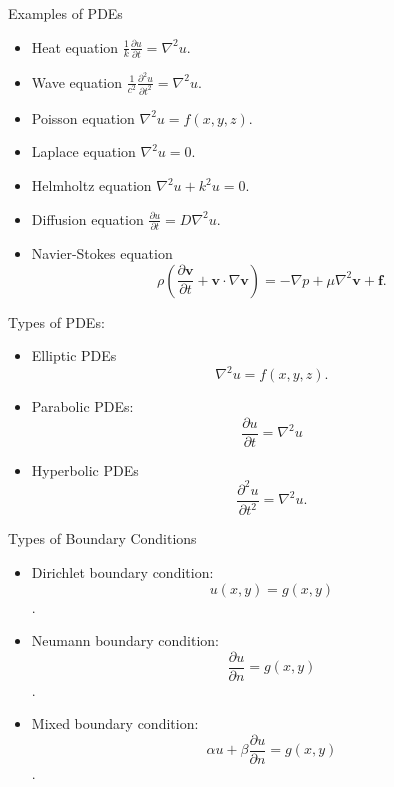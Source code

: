 \documentclass{beamer}
\begin{document}
\begin{frame}{Examples of PDEs}
    \begin{itemize}
            \item Heat equation $\frac{1}{k} \frac{\partial u}{\partial t}=\nabla^2 u$.
            \item Wave equation $\frac{1}{c^2} \frac{\partial^2 u}{\partial t^2}=\nabla^2 u$.

            \item Poisson equation $\nabla^2 u = f(x, y, z)$.
            \item Laplace equation $\nabla^2 u = 0$.
            \item Helmholtz equation $\nabla^2 u + k^2 u = 0$.
            \item Diffusion equation $\frac{\partial u}{\partial t} = D \nabla^2 u$.
            \item Navier-Stokes equation 
            \[
            \rho \left(\frac{\partial \mathbf{v}}{\partial t} + \mathbf{v} \cdot \nabla
             \mathbf{v}\right) = -\nabla p + \mu \nabla^2 \mathbf{v} + \mathbf{f}.
            \]
        \end{itemize}
\end{frame}
\begin{frame}{Types of PDEs:}

    \begin{itemize}
        \item Elliptic PDEs
        \[\nabla^2 u = f(x, y, z).
        \]
        
        \item Parabolic PDEs: 
        \[\frac{\partial u}{\partial t} = \nabla^2 u\]
        \item Hyperbolic PDEs\[\frac{\partial^2 u}{\partial t^2} = \nabla^2 u.\]
    \end{itemize}

\end{frame}
\begin{frame}{Types of Boundary Conditions}

    \begin{itemize}
     \item Dirichlet boundary condition: $$u(x, y) = g(x, y)$$.
    \item Neumann boundary condition: $$\frac{\partial u}{\partial n} = g(x, y)$$.
    \item Mixed boundary condition: $$\alpha u + \beta \frac{\partial u}{\partial n} = g(x, y)$$.
    \end{itemize}
\end{frame}
\end{document}
